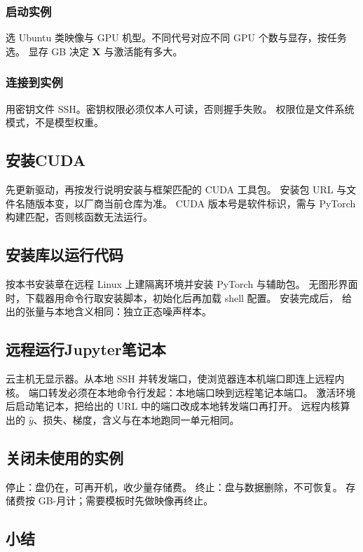 \subsubsection{启动实例}

选 Ubuntu 类映像与 GPU 机型。不同代号对应不同 GPU 个数与显存，按任务选。
显存 GB 决定 $\bm{X}$ 与激活能有多大。

\subsubsection{连接到实例}

用密钥文件 SSH。密钥权限必须仅本人可读，否则握手失败。
权限位是文件系统模式，不是模型权重。

\subsection{安装CUDA}

先更新驱动，再按发行说明安装与框架匹配的 CUDA 工具包。
安装包 URL 与文件名随版本变，以厂商当前仓库为准。
CUDA 版本号是软件标识，需与 PyTorch 构建匹配，否则核函数无法运行。

\subsection{安装库以运行代码}

按本书安装章在远程 Linux 上建隔离环境并安装 PyTorch 与辅助包。
无图形界面时，下载器用命令行取安装脚本，初始化后再加载 shell 配置。
安装完成后， 给出的张量与本地含义相同：独立正态噪声样本。

\subsection{远程运行Jupyter笔记本}

云主机无显示器。从本地 SSH 并转发端口，使浏览器连本机端口即连上远程内核。
端口转发必须在本地命令行发起：本地端口映到远程笔记本端口。
激活环境后启动笔记本，把给出的 URL 中的端口改成本地转发端口再打开。
远程内核算出的 $\hat y$、损失、梯度，含义与在本地跑同一单元相同。

\subsection{关闭未使用的实例}

停止：盘仍在，可再开机，收少量存储费。
终止：盘与数据删除，不可恢复。
存储费按 GB-月计；需要模板时先做映像再终止。

\subsection{小结}

